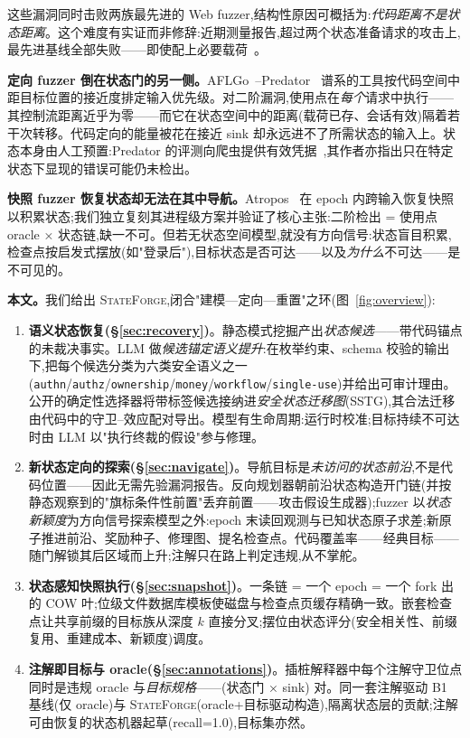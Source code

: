 \documentclass[letterpaper,twocolumn,10pt]{article}
\newcommand{\sys}{\textsc{StateForge}}
\begin{document}
这些漏洞同时击败两族最先进的 Web fuzzer,结构性原因可概括为:\emph{代码距离不是状态距离}。这个难度有实证而非修辞:近期测量报告,超过两个状态准备请求的攻击上,最先进基线全部失败——即使配上必要载荷~\cite{ariadne}。

\textbf{定向 fuzzer 倒在状态门的另一侧。}AFLGo~\cite{aflgo}--Predator~\cite{predator} 谱系的工具按代码空间中距目标位置的接近度排定输入优先级。对二阶漏洞,使用点在\emph{每个}请求中执行——其控制流距离近乎为零——而它在状态空间中的距离(载荷已存、会话有效)隔着若干次转移。代码定向的能量被花在接近 sink 却永远进不了所需状态的输入上。状态本身由人工预置:Predator 的评测向爬虫提供有效凭据~\cite{predator},其作者亦指出只在特定状态下显现的错误可能仍未检出。

\textbf{快照 fuzzer 恢复状态却无法在其中导航。}Atropos~\cite{atropos} 在 epoch 内跨输入恢复快照以积累状态;我们独立复刻其进程级方案并验证了核心主张:二阶检出 = 使用点 oracle × 状态链,缺一不可。但若无状态空间模型,就没有方向信号:状态盲目积累,检查点按启发式摆放(如"登录后"),目标状态是否可达——以及\emph{为什么}不可达——是不可见的。

\textbf{本文。}我们给出 \sys{},闭合"建模—定向—重置"之环(图~\ref{fig:overview}):

\begin{enumerate}
\item \textbf{语义状态恢复(\S\ref{sec:recovery})}。静态模式挖掘产出\emph{状态候选}——带代码锚点的未裁决事实。LLM 做\emph{候选锚定语义提升}:在枚举约束、schema 校验的输出下,把每个候选分类为六类安全语义之一(\texttt{authn}/\texttt{authz}/\texttt{ownership}/\texttt{money}/\texttt{workflow}/\texttt{single-use})并给出可审计理由。公开的确定性选择器将带标签候选接纳进\emph{安全状态迁移图}(SSTG),其合法迁移由代码中的守卫--效应配对导出。模型有生命周期:运行时校准;目标持续不可达时由 LLM 以"执行终裁的假设"参与修理。
\item \textbf{新状态定向的探索(\S\ref{sec:navigate})}。导航目标是\emph{未访问的状态前沿},不是代码位置——因此无需先验漏洞报告。反向规划器朝前沿状态构造开门链(并按静态观察到的"旗标条件性前置"丢弃前置——攻击假设生成器);fuzzer 以\emph{状态新颖度}为方向信号探索模型之外:epoch 末读回观测与已知状态原子求差;新原子推进前沿、奖励种子、修理图、提名检查点。代码覆盖率——经典目标——随门解锁其后区域而上升;注解只在路上判定违规,从不掌舵。
\item \textbf{状态感知快照执行(\S\ref{sec:snapshot})}。一条链 = 一个 epoch = 一个 fork 出的 COW 叶;位级文件数据库模板使磁盘与检查点页缓存精确一致。嵌套检查点让共享前缀的目标族从深度 $k$ 直接分叉;摆位由状态评分(安全相关性、前缀复用、重建成本、新颖度)调度。
\item \textbf{注解即目标与 oracle(\S\ref{sec:annotations})}。插桩解释器中每个注解守卫位点同时是违规 oracle 与\emph{目标规格}——(状态门 × sink) 对。同一套注解驱动 B1 基线(仅 oracle)与 \sys{}(oracle+目标驱动构造),隔离状态层的贡献;注解可由恢复的状态机器起草(recall=1.0),目标集亦然。
\end{enumerate}
\end{document}
